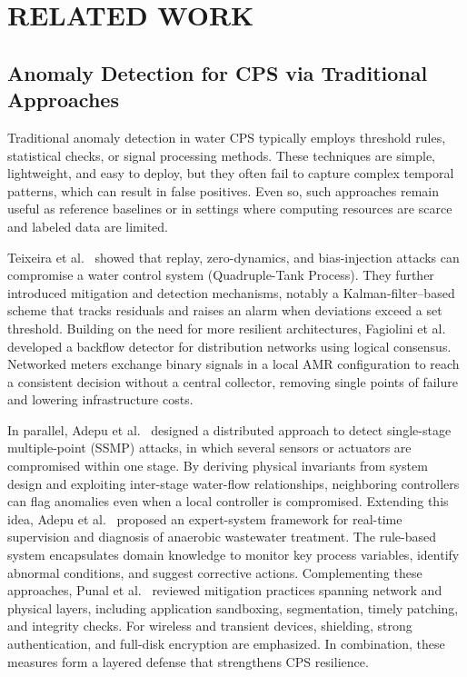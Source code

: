 \documentclass[pdflatex,sn-mathphys-num]{sn-jnl}%
\theoremstyle{thmstyleone}
\theoremstyle{thmstyletwo}%
\theoremstyle{thmstylethree}%
\begin{document}
\section{RELATED WORK}\label{sec: related}
\subsection{Anomaly Detection for CPS via Traditional Approaches}\label{related: noML}
Traditional anomaly detection in water CPS typically employs threshold rules, statistical checks, or signal processing methods. These techniques are simple, lightweight, and easy to deploy, but they often fail to capture complex temporal patterns, which can result in false positives. Even so, such approaches remain useful as reference baselines or in settings where computing resources are scarce and labeled data are limited.

Teixeira et al.~\cite{teixeira2012attack} showed that replay, zero-dynamics, and bias-injection attacks can compromise a water control system (Quadruple-Tank Process). They further introduced mitigation and detection mechanisms, notably a Kalman-filter--based scheme that tracks residuals and raises an alarm when deviations exceed a set threshold.
Building on the need for more resilient architectures, Fagiolini et al.~\cite{fagiolini2014distributed} developed a backflow detector for distribution networks using logical consensus. Networked meters exchange binary signals in a local AMR configuration to reach a consistent decision without a central collector, removing single points of failure and lowering infrastructure costs.

In parallel, Adepu et al.~\cite{adepu2016using} designed a distributed approach to detect single-stage multiple-point (SSMP) attacks, in which several sensors or actuators are compromised within one stage. By deriving physical invariants from system design and exploiting inter-stage water-flow relationships, neighboring controllers can flag anomalies even when a local controller is compromised. Extending this idea, Adepu et al.~\cite{adepu2016distributed} proposed an expert-system framework for real-time supervision and diagnosis of anaerobic wastewater treatment. The rule-based system encapsulates domain knowledge to monitor key process variables, identify abnormal conditions, and suggest corrective actions.
Complementing these approaches, Punal et al.~\cite{punal2002expert} reviewed mitigation practices spanning network and physical layers, including application sandboxing, segmentation, timely patching, and integrity checks. For wireless and transient devices, shielding, strong authentication, and full-disk encryption are emphasized. In combination, these measures form a layered defense that strengthens CPS resilience.
\end{document}
